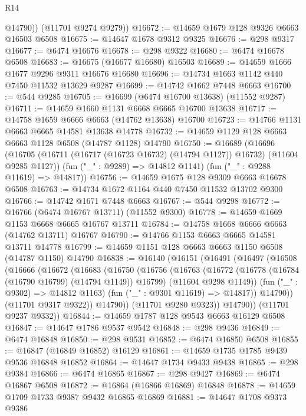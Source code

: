 \begin{lexlean}{R14}
\begin{coremodule}
          @14790))
      (@11701 @9274 @9279))
@16672 := @14659 @1679 @128 @9326 @6663 @16503 @6508
@16675 := @14647 @1678 @9312 @9325
@16676 := @298 @9317
@16677 := @6474 @16676
@16678 := @298 @9322
@16680 := @6474 @16678 @6508
@16683 := @16675 (@16677 @16680) @16503
@16689 := @14659 @1666 @1677 @9296 @9311 @16676 @16680
@16696 := @14734 @1663 @1142 @440 @7450 @11532 @13629 @9287
@16699 := @14742 @1662 @7448 @6663
@16700 := @544 @9285
@16705 := @16699 (@6474 @16700 @13638) (@11552 @9287)
@16711 := @14659 @1660 @1131 @6668 @6665 @16700 @13638
@16717 := @14758 @1659 @6666 @6663 (@14762 @13638) @16700
@16723 := @14766 @1131 @6663 @6665 @14581 @13638 @14778
@16732 := @14659 @1129 @128 @6663 @6663 @1128 @6508 (@14787 @1128) @14790
@16750 := @16689
    (@16696
      (@16705 (@16711 (@16717 (@16723 @16732) (@14794 @1127)) @16732) (@11604 @9285 @1127))
      (fun ("_" : @9289) => @14812 @1141)
      (fun ("_" : @9288 @11619) => @14817))
@16756 := @14659 @1675 @128 @9309 @6663 @16678 @6508
@16763 := @14734 @1672 @1164 @440 @7450 @11532 @13702 @9300
@16766 := @14742 @1671 @7448 @6663
@16767 := @544 @9298
@16772 := @16766 (@6474 @16767 @13711) (@11552 @9300)
@16778 := @14659 @1669 @1153 @6668 @6665 @16767 @13711
@16784 := @14758 @1668 @6666 @6663 (@14762 @13711) @16767
@16790 := @14766 @1153 @6663 @6665 @14581 @13711 @14778
@16799 := @14659 @1151 @128 @6663 @6663 @1150 @6508 (@14787 @1150) @14790
@16838 := @16140
    (@16151
      (@16491
        (@16497
          (@16508
            (@16666
              (@16672
                (@16683
                  (@16750
                    (@16756
                      (@16763
                        (@16772
                          (@16778 (@16784 (@16790 @16799) (@14794 @1149)) @16799)
                          (@11604 @9298 @1149))
                        (fun ("_" : @9302) => @14812 @1163)
                        (fun ("_" : @9301 @11619) => @14817))
                      @14790))
                  (@11701 @9317 @9322))
                @14790))
            (@11701 @9280 @9323))
          @14790))
      (@11701 @9237 @9332))
@16844 := @14659 @1787 @128 @9543 @6663 @16129 @6508
@16847 := @14647 @1786 @9537 @9542
@16848 := @298 @9436
@16849 := @6474 @16848
@16850 := @298 @9531
@16852 := @6474 @16850 @6508
@16855 := @16847 (@16849 @16852) @16129
@16861 := @14659 @1735 @1785 @9439 @9536 @16848 @16852
@16864 := @14647 @1734 @9433 @9438
@16865 := @298 @9384
@16866 := @6474 @16865
@16867 := @298 @9427
@16869 := @6474 @16867 @6508
@16872 := @16864 (@16866 @16869) @16848
@16878 := @14659 @1709 @1733 @9387 @9432 @16865 @16869
@16881 := @14647 @1708 @9373 @9386

\end{coremodule}
\end{lexlean}
